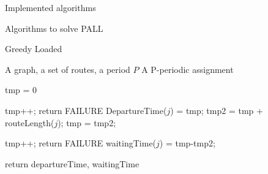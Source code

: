 \documentclass[10pt]{article}
\begin{document}
\begin{section}{Implemented algorithms}
\begin{subsection}{Algorithms to solve PALL}
\begin{subsubsection}{Greedy Loaded}
   	\begin{algorithm}[H]
 	\caption{Greedy Loaded}
 	\begin{algorithmic}
 	\REQUIRE A graph, a set of routes, a period $P$
	\ENSURE A P-periodic assignment

	
	\STATE tmp = $0$
	
 	
 	\STATE tmp++;
	\STATE return FAILURE
	\ENDIF
 	\ENDWHILE
	\STATE DepartureTime($j$) = tmp;
	\STATE tmp2 = tmp + routeLength($j$);
	\STATE tmp = tmp2;
	
 	
 	\STATE tmp++;
	\STATE return FAILURE
	\ENDIF
 	\ENDWHILE
	\STATE waitingTime($j$) = tmp-tmp2;
	\ENDIF
 	\ENDFOR

 	\ENDFOR
	\STATE return departureTime, waitingTime

 	\end{algorithmic}
 	\end{algorithm}

    \end{subsubsection}
  \end{subsection}

\end{section}


\end{document}
